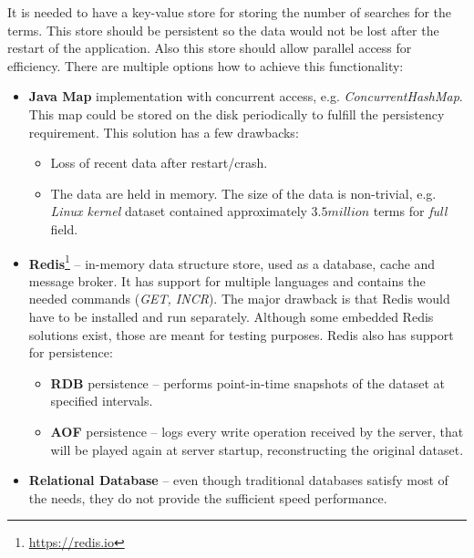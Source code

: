 It is needed to have a key-value store for storing the number of searches for the terms. This store should be persistent
so the data would not be lost after the restart of the application. Also this store should allow parallel access for
efficiency. There are multiple options how to achieve this functionality:
\begin{itemize}
    \item \textbf{Java Map} implementation with concurrent access, e.g. \textit{ConcurrentHashMap}. This map could be stored
    on the disk periodically to fulfill the persistency requirement. This solution has a few drawbacks:
    \begin{itemize}
        \item Loss of recent data after restart/crash.
        \item The data are held in memory. The size of the data is non-trivial, e.g.
        \textit{Linux kernel} dataset contained approximately $3.5 million$ terms for \textit{full} field.
    \end{itemize}

    \item \textbf{Redis}\footnote{\url{https://redis.io}} – in-memory data structure store, used as a database, cache
    and message broker. It has support for multiple languages and contains the needed commands (\textit{GET, INCR}).
    The major drawback is that Redis would have to be installed and run separately. Although some embedded Redis solutions
    exist, those are meant for testing purposes. Redis also has support for persistence:
    \begin{itemize}
        \item \textbf{RDB} persistence – performs point-in-time snapshots of the dataset at specified intervals.
        \item \textbf{AOF} persistence – logs every write operation received by the server, that will be played again
        at server startup, reconstructing the original dataset.
    \end{itemize}

    \item \textbf{Relational Database} – even though traditional databases satisfy most of the needs, they do not
    provide the sufficient speed performance.


\end{itemize}
